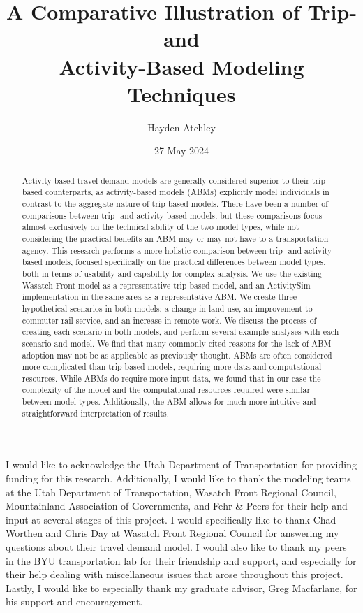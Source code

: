 \documentclass[fancy, twoside, mastersfancy, ms]{byuthesis}
\title{A Comparative Illustration of Trip- and\\
Activity-Based Modeling Techniques}
\author{Hayden Atchley}
\date{27 May 2024}
\begin{document}
\frontmatter
\titlepage
\cleardoublepage

\customtitlepage
\cleardoublepage


  \begin{abstract}
Activity-based travel demand models are generally considered superior to
their trip-based counterparts, as activity-based models (ABMs)
explicitly model individuals in contrast to the aggregate nature of
trip-based models. There have been a number of comparisons between trip-
and activity-based models, but these comparisons focus almost
exclusively on the technical ability of the two model types, while not
considering the practical benefits an ABM may or may not have to a
transportation agency. This research performs a more holistic comparison
between trip- and activity-based models, focused specifically on the
practical differences between model types, both in terms of usability
and capability for complex analysis. We use the existing Wasatch Front
model as a representative trip-based model, and an ActivitySim
implementation in the same area as a representative ABM. We create three
hypothetical scenarios in both models: a change in land use, an
improvement to commuter rail service, and an increase in remote work. We
discuss the process of creating each scenario in both models, and
perform several example analyses with each scenario and model. We find
that many commonly-cited reasons for the lack of ABM adoption may not be
as applicable as previously thought. ABMs are often considered more
complicated than trip-based models, requiring more data and
computational resources. While ABMs do require more input data, we found
that in our case the complexity of the model and the computational
resources required were similar between model types. Additionally, the
ABM allows for much more intuitive and straightforward interpretation of
results.
\end{abstract}
\cleardoublepage

\begin{acknowledgments}
I would like to acknowledge the Utah Department of Transportation for
providing funding for this research. Additionally, I would like to thank
the modeling teams at the Utah Department of Transportation, Wasatch
Front Regional Council, Mountainland Association of Governments, and
Fehr \& Peers for their help and input at several stages of this
project. I would specifically like to thank Chad Worthen and Chris Day
at Wasatch Front Regional Council for answering my questions about their
travel demand model. I would also like to thank my peers in the BYU
transportation lab for their friendship and support, and especially for
their help dealing with miscellaneous issues that arose throughout this
project. Lastly, I would like to especially thank my graduate advisor,
Greg Macfarlane, for his support and encouragement.
\end{acknowledgments}
\cleardoublepage
\end{document}
